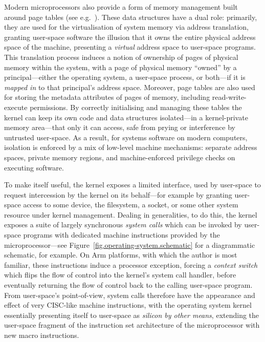 \documentclass[a4paper, UKenglish, cleveref, autoref, thm-restate, colorlinks]{lipics-v2021}
\begin{document}
Modern microprocessors also provide a form of memory management built around page tables (see e.g.~\cite{arm-vmsa}).
These data structures have a dual role: primarily, they are used for the virtualisation of system memory via address translation, granting user-space software the illusion that it owns the entire physical address space of the machine, presenting a \emph{virtual} address space to user-space programs.
This translation process induces a notion of ownership of pages of physical memory within the system, with a page of physical memory ``owned'' by a principal---either the operating system, a user-space process, or both---if it is \emph{mapped in} to that principal's address space.
Moreover, page tables are also used for storing the metadata attributes of pages of memory, including read-write-execute permissions.
By correctly initialising and managing these tables the kernel can keep its own code and data structures isolated---in a kernel-private memory area---that only it can access, safe from prying or interference by untrusted user-space.
As a result, for systems software on modern computers, isolation is enforced by a mix of low-level machine mechanisms: separate address spaces, private memory regions, and machine-enforced privilege checks on executing software.

To make itself useful, the kernel exposes a limited interface, used by user-space to request intercession by the kernel on its behalf---for example by granting user-space access to some device, the filesystem, a socket, or some other system resource under kernel management.
Dealing in generalities, to do this, the kernel exposes a suite of largely synchronous \emph{system calls} which can be invoked by user-space programs with dedicated machine instructions provided by the microprocessor---see Figure~\ref{fig.operating-system.schematic} for a diagrammatic schematic, for example.
On Arm platforms, with which the author is most familiar, these instructions induce a processor exception, forcing a \emph{context switch} which flips the flow of control into the kernel's system call handler, before eventually returning the flow of control back to the calling user-space program.
From user-space's point-of-view, system calls therefore have the appearance and effect of very CISC-like machine instructions, with the operating system kernel essentially presenting itself to user-space as \emph{silicon by other means}, extending the user-space fragment of the instruction set architecture of the microprocessor with new macro instructions.
\end{document}
